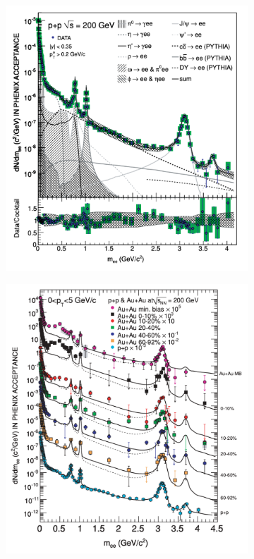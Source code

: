 \begin{figure}[htb]
    \centering
    \begin{subfigure}[b]{0.45\textwidth}
        \centering
        \includegraphics[width=\textwidth,clip]{figures/Chapter1/PHENIXpp.png}
        \caption{}
        \label{fig:PHENIXpp}
    \end{subfigure}
    \hfill
    \begin{subfigure}[b]{0.45\textwidth}
        \centering
        \includegraphics[width=\textwidth,clip]{figures/Chapter1/PHENIXAuAu.png}

\end{subfigure}
\end{figure}
